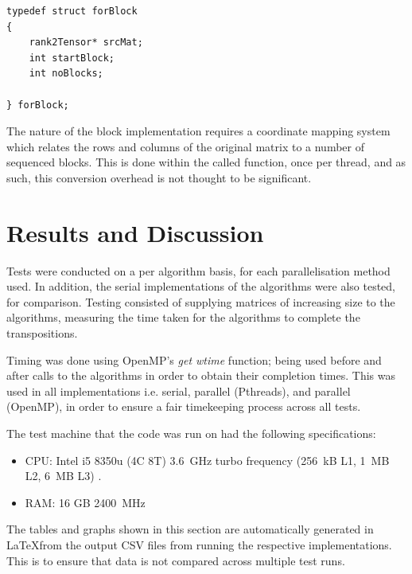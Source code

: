 \documentclass[journal,10pt]{IEEEtran}
\begin{document}
\begin{lstlisting}
typedef struct forBlock
{
	rank2Tensor* srcMat;
	int startBlock;
	int noBlocks;

} forBlock;
\end{lstlisting}

The nature of the block implementation requires a coordinate mapping system which relates the rows and columns of the original matrix to a number of sequenced blocks. This is done within the called function, once per thread, and as such, this conversion overhead is not thought to be significant.

\section{Results and Discussion}

Tests were conducted on a per algorithm basis, for each parallelisation method used. In addition, the serial implementations of the algorithms were also tested, for comparison. Testing consisted of supplying matrices of increasing size to the algorithms, measuring the time taken for the algorithms to complete the transpositions.

Timing was done using OpenMP's \textit{get wtime} function; being used before and after calls to the algorithms in order to obtain their completion times. This was used in all implementations i.e. serial, parallel (Pthreads), and parallel (OpenMP), in order to ensure a fair timekeeping process across all tests.

The test machine that the code was run on had the following specifications:

\begin{itemize}
    \item CPU: Intel i5 8350u (4C 8T) 3.6~GHz turbo frequency (256~kB L1, 1~MB L2, 6~MB L3) \cite{8350u}.
    \item RAM: 16 GB \@ 2400~MHz
\end{itemize}


The tables and graphs shown in this section are automatically generated in \LaTeX from the output CSV files from running the respective implementations. This is to ensure that data is not compared across multiple test runs.
\end{document}
